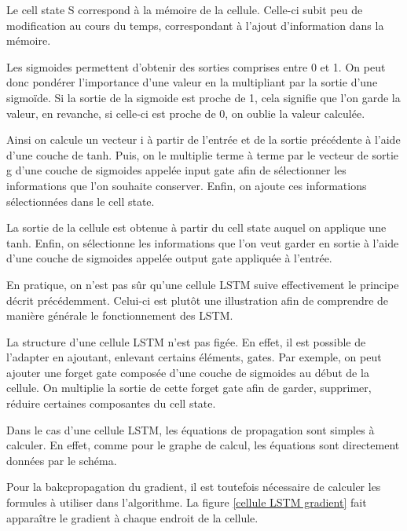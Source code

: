 \documentclass{report}
\theoremstyle{plain}
\theoremstyle{definition}
\theoremstyle{remark}
\begin{document}
Le cell state S correspond à la mémoire de la cellule. Celle-ci subit peu de modification au cours du temps, correspondant à l'ajout d'information dans la mémoire.

Les sigmoides permettent d'obtenir des sorties comprises entre 0 et 1. On peut donc pondérer l'importance d'une valeur en la multipliant par la sortie d'une sigmoïde. Si la sortie de la sigmoide est proche de 1, cela signifie que l'on garde la valeur, en revanche, si celle-ci est proche de 0, on oublie la valeur calculée.

Ainsi on calcule un vecteur i à partir de l'entrée et de la sortie précédente à l'aide d'une couche de tanh. Puis, on le multiplie terme à terme par le vecteur de sortie g d'une couche de sigmoides appelée input gate afin de sélectionner les informations que l'on souhaite conserver. Enfin, on ajoute ces informations sélectionnées dans le cell state. 

La sortie de la cellule est obtenue à partir du cell state auquel on applique une tanh. Enfin, on sélectionne les informations que l'on veut garder en sortie à l'aide d'une couche de sigmoides appelée output gate appliquée à l'entrée.


En pratique, on n'est pas sûr qu'une cellule LSTM suive effectivement le principe décrit précédemment. Celui-ci est plutôt une illustration afin de comprendre de manière générale le fonctionnement des LSTM.

La structure d'une cellule LSTM n'est pas figée. En effet, il est possible de l'adapter en ajoutant, enlevant certains éléments, gates. Par exemple, on peut ajouter une forget gate composée d'une couche de sigmoides au début de la cellule. On multiplie la sortie de cette forget gate afin de garder, supprimer, réduire certaines composantes du cell state. 

\break

Dans le cas d'une cellule LSTM, les équations de propagation sont simples à calculer. En effet, comme pour le graphe de calcul, les équations sont directement données par le schéma.

Pour la bakcpropagation du gradient, il est toutefois nécessaire de calculer les formules à utiliser dans l'algorithme. La figure \ref{cellule LSTM gradient} fait apparaître le gradient à chaque endroit de la cellule.
\end{document}
